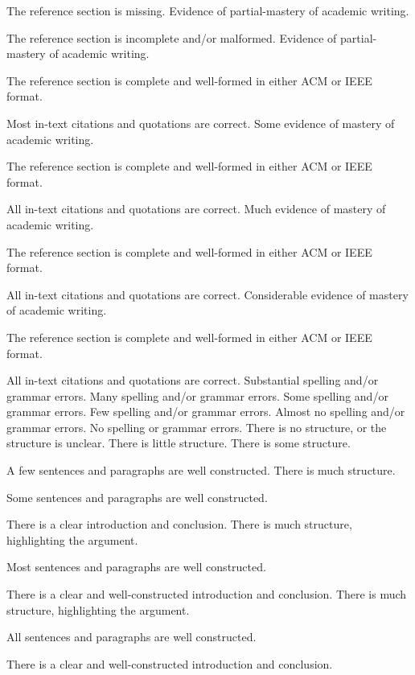 \documentclass{../fal_assignment}
\begin{document}
\begin{markingrubric}
        \par 		The reference section is missing.
        \grade 		Evidence of partial-mastery of academic writing.
        \par 		The reference section is incomplete and/or malformed.
        \grade 		Evidence of partial-mastery of academic writing.
        \par 		The reference section is complete and well-formed in either ACM or IEEE format.
        \par 		Most in-text citations and quotations are correct.
        \grade 		Some evidence of mastery of academic writing.
        \par 		The reference section is complete and well-formed in either ACM or IEEE format.
        \par 		All in-text citations and quotations are correct.
        \grade 		Much evidence of mastery of academic writing.
        \par 		The reference section is complete and well-formed in either ACM or IEEE format.
        \par 		All in-text citations and quotations are correct.
        \grade 		Considerable evidence of mastery of academic writing.
        \par 		The reference section is complete and well-formed in either ACM or IEEE format.
        \par 		All in-text citations and quotations are correct.
%
        \grade\fail 	Substantial spelling and/or grammar errors.
        \grade 		Many spelling and/or grammar errors.
        \grade 		Some spelling and/or grammar errors.  
        \grade 		Few spelling and/or grammar errors.
        \grade 		Almost no spelling and/or grammar errors.
        \grade 		No spelling or grammar errors.
%
        \grade\fail 	There is no structure, or the structure is unclear.
        \grade 		There is little structure.
        \grade 		There is some structure.
        \par 		A few sentences and paragraphs are well constructed.
        \grade 		There is much structure.
        \par 		Some sentences and paragraphs are well constructed.
        \par 		There is a clear introduction and conclusion.
        \grade 		There is much structure, highlighting the argument.
        \par 		Most sentences and paragraphs are well constructed.
        \par 		There is a clear and well-constructed introduction and conclusion.
        \grade 		There is much structure, highlighting the argument.
        \par 		All sentences and paragraphs are well constructed.
        \par 		There is a clear and well-constructed introduction and conclusion.
\end{markingrubric}
\end{document}
